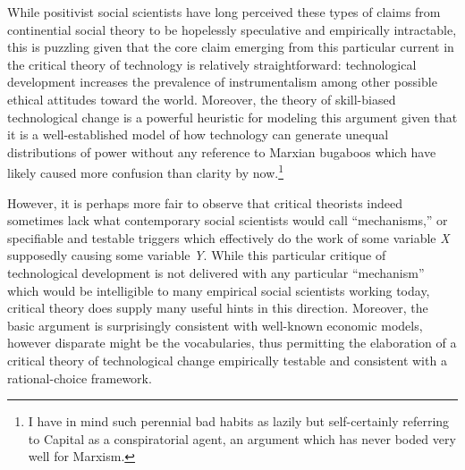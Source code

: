\documentclass[a4paper,12pt,margin=.5in]{article}
\begin{document}
While positivist social scientists have long perceived these types of
claims from continential social theory to be hopelessly speculative and
empirically intractable, this is puzzling given that the core claim
emerging from this particular current in the critical theory of
technology is relatively straightforward: technological development
increases the prevalence of instrumentalism among other possible ethical
attitudes toward the world. Moreover, the theory of skill-biased
technological change is a powerful heuristic for modeling this argument
given that it is a well-established model of how technology can generate
unequal distributions of power without any reference to Marxian bugaboos
which have likely caused more confusion than clarity by now.\footnote{I
  have in mind such perennial bad habits as lazily but self-certainly
  referring to Capital as a conspiratorial agent, an argument which has
  never boded very well for Marxism.}

However, it is perhaps more fair to observe that critical theorists
indeed sometimes lack what contemporary social scientists would call
``mechanisms,'' or specifiable and testable triggers which effectively
do the work of some variable \emph{X} supposedly causing some variable
\emph{Y}. While this particular critique of technological development is
not delivered with any particular ``mechanism'' which would be
intelligible to many empirical social scientists working today, critical
theory does supply many useful hints in this direction. Moreover, the
basic argument is surprisingly consistent with well-known economic
models, however disparate might be the vocabularies, thus permitting the
elaboration of a critical theory of technological change empirically
testable and consistent with a rational-choice framework.
\end{document}
